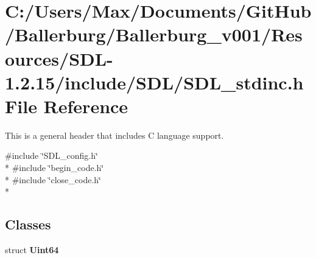 \section{C\+:/\+Users/\+Max/\+Documents/\+Git\+Hub/\+Ballerburg/\+Ballerburg\+\_\+v001/\+Resources/\+S\+D\+L-\/1.2.15/include/\+S\+D\+L/\+S\+D\+L\+\_\+stdinc.h File Reference}
\label{_s_d_l__stdinc_8h}


This is a general header that includes C language support.  


{\ttfamily \#include \char`\"{}S\+D\+L\+\_\+config.\+h\char`\"{}}\\*
{\ttfamily \#include \char`\"{}begin\+\_\+code.\+h\char`\"{}}\\*
{\ttfamily \#include \char`\"{}close\+\_\+code.\+h\char`\"{}}\\*
\subsection*{Classes}
\begin{DoxyCompactItemize}
\item 
struct {\bf Uint64}
\end{DoxyCompactItemize}
